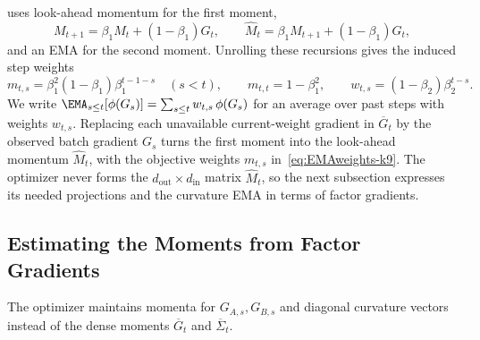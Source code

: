  uses look-ahead momentum for the first moment,
\[
  M_{t+1}=\beta_1M_t+(1-\beta_1)G_t,
  \qquad
  \widehat M_t=\beta_1M_{t+1}+(1-\beta_1)G_t,
\]
and an EMA for the second moment. Unrolling these recursions
gives the induced step weights
\begin{equation}\label{eq:EMAweights-k9}
  m_{t,s}=\beta_1^2(1-\beta_1)\beta_1^{t-1-s}
  \quad(s<t),
  \qquad
  m_{t,t}=1-\beta_1^2,
  \qquad
  w_{t,s}=(1-\beta_2)\beta_2^{t-s}.
\end{equation}
We write $\EMA_{s\le t}[\phi(G_s)]=\sum_{s\le t}w_{t,s}\,\phi(G_s)$ for an
average over past steps with weights $w_{t,s}$. Replacing each unavailable
current-weight gradient in $\overline G_t$ by the observed batch gradient
$G_s$ turns the first moment into the look-ahead momentum $\widehat M_t$,
with the objective weights $m_{t,s}$ in~\eqref{eq:EMAweights-k9}. The
optimizer never forms the $d_{\mathrm{out}}\times d_{\mathrm{in}}$ matrix
$\widehat M_t$, so the next subsection expresses its needed projections and
the curvature EMA in terms of factor gradients.

\subsection{Estimating the Moments from Factor Gradients}
\label{sec:weighted-estimation-k9}

The optimizer maintains momenta for $G_{A,s},G_{B,s}$ and diagonal
curvature vectors instead of the dense moments $\overline G_t$ and
$\overline\Sigma_t$.

